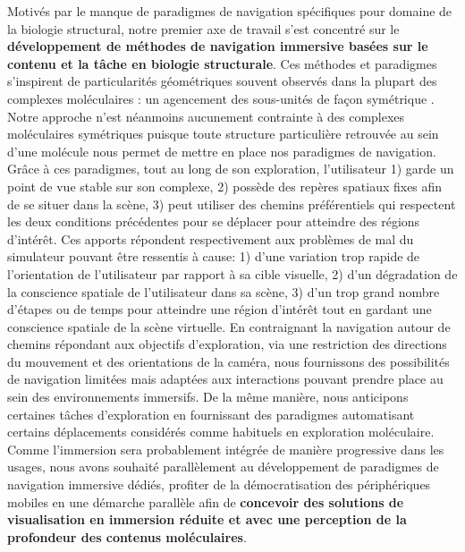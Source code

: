 Motivés par le manque de paradigmes de navigation spécifiques pour domaine de la biologie structural, notre premier axe de travail s'est concentré sur le \textbf{développement de méthodes de navigation immersive basées sur le contenu et la tâche en biologie structurale}. Ces méthodes et paradigmes s'inspirent de  particularités géométriques souvent observés dans la plupart des complexes moléculaires : un agencement des sous-unités de façon symétrique \cite{goodsell_structural_2000}. Notre approche n'est néanmoins aucunement contrainte à des complexes moléculaires symétriques puisque toute structure particulière retrouvée au sein d'une molécule nous permet de mettre en place nos paradigmes de navigation. Grâce à ces paradigmes, tout au long de son exploration, l'utilisateur 1) garde un point de vue stable sur son complexe, 2) possède des repères spatiaux fixes afin de se situer dans la scène, 3) peut utiliser des chemins préférentiels qui respectent les deux conditions précédentes pour se déplacer pour atteindre des régions d’intérêt. Ces apports répondent respectivement aux problèmes de mal du simulateur pouvant être ressentis à cause: 1) d'une variation trop rapide de l'orientation de l'utilisateur par rapport à sa cible visuelle, 2) d'un dégradation de la conscience spatiale de l'utilisateur dans sa scène, 3) d'un trop grand nombre d'étapes ou de temps pour atteindre une région d'intérêt tout en gardant une conscience spatiale de la scène virtuelle. En contraignant la navigation autour de chemins répondant aux objectifs d'exploration, via une restriction des directions du mouvement et des orientations de la caméra, nous fournissons des possibilités de navigation limitées mais adaptées aux interactions pouvant prendre place au sein des environnements immersifs. De la même manière, nous anticipons certaines tâches d'exploration en fournissant des paradigmes automatisant certains déplacements considérés comme habituels en exploration moléculaire. Comme l'immersion sera probablement intégrée de manière progressive dans les usages, nous avons souhaité parallèlement au développement de paradigmes de navigation immersive dédiés, profiter de la démocratisation des périphériques mobiles en une démarche parallèle afin de \textbf{concevoir des solutions de visualisation en immersion réduite et avec une perception de la profondeur des contenus moléculaires}. 





